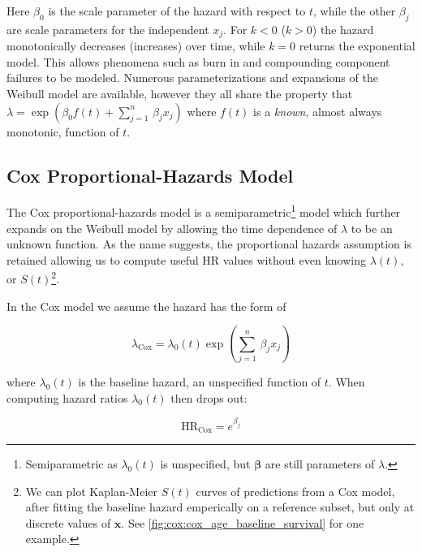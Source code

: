 \noindent Here $\beta_{0}$ is the scale parameter of the hazard with respect to $t$,
while the other $\beta_{j}$ are scale parameters for the independent $x_{j}$.
For $k<0$ ($k>0$) the hazard monotonically decreases (increases) over time,
while $k=0$ returns the exponential model.
This allows phenomena such as burn in and compounding component failures to be modeled.
Numerous parameterizations and expansions of the Weibull model are available,
however they all share the property that
$\lambda = \exp\left(\beta_{0} f\left(t\right) + \sum_{j=1}^{n}\, \beta_{j} x_{j}\right)$
where $f\left(t\right)$ is a {\em known}, almost always monotonic, function of $t$.

\subsection{Cox Proportional-Hazards Model}
\label{additional:Survival:cox}

The Cox proportional-hazards model \cite{cox} is a
semiparametric\footnote{Semiparametric as $\lambda_{0}\left(t\right)$ is unspecified, but $\bm{\beta}$ are still parameters of $\lambda$.} model
which further expands on the Weibull model by allowing
the time dependence of $\lambda$ to be an unknown function.
As the name suggests, the proportional hazards assumption is retained
allowing us to compute useful HR values
without even knowing $\lambda\left(t\right)$,
or $S\left(t\right)$\footnote{We can
plot Kaplan-Meier $S\left(t\right)$ curves of predictions from a Cox model,
after fitting the baseline hazard emperically on a reference subset,
but only at discrete values of $\mathbf{x}$.
See \cref{fig:cox:cox_age_baseline_survival} for one example.}.

In the Cox model we assume the hazard has the form of

\begin{equation}\label{eq:Survival:cox_lambda}
\lambda_{\text{Cox}} = \lambda_{0}\left(t\right) \exp\left(\sum_{j=1}^{n}\, \beta_{j} x_{j}\right)
\end{equation}

\noindent where $\lambda_{0}\left(t\right)$ is the baseline hazard, an unspecified function of $t$.
When computing hazard ratios $\lambda_{0}\left(t\right)$ then drops out:

\begin{equation}\label{eq:Survival:cox_HR}
\text{HR}_{\text{Cox}} = e^{\beta_{j}}
\end{equation}

